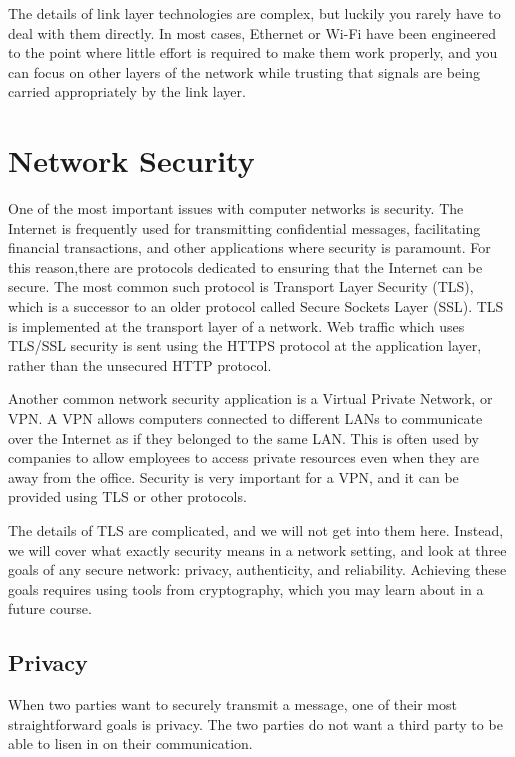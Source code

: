 The details of link layer technologies are complex, but luckily you rarely have to deal with them directly. In most cases, Ethernet or Wi-Fi have been engineered to the point where little effort is required to make them work properly, and you can focus on other layers of the network while trusting that signals are being carried appropriately by the link layer.


\section{Network Security}\label{sec:network:security}

One of the most important issues with computer networks is security. The Internet is frequently used for transmitting confidential messages, facilitating financial transactions, and other applications where security is paramount. For this reason,there are protocols dedicated to ensuring that the Internet can be secure. The most common such protocol is Transport Layer Security (TLS), which is a successor to an older protocol called Secure Sockets Layer (SSL). TLS is implemented at the transport layer of a network. Web traffic which uses TLS/SSL security is sent using the HTTPS protocol at the application layer, rather than the unsecured HTTP protocol.

Another common network security application is a Virtual Private Network, or VPN. A VPN allows computers connected to different LANs to communicate over the Internet as if they belonged to the same LAN. This is often used by companies to allow employees to access private resources even when they are away from the office. Security is very important for a VPN, and it can be provided using TLS or other protocols.

The details of TLS are complicated, and we will not get into them here. Instead, we will cover what exactly security means in a network setting, and look at three goals of any secure network: privacy, authenticity, and reliability. Achieving these goals requires using tools from cryptography, which you may learn about in a future course.

\subsection{Privacy}

When two parties want to securely transmit a message, one of their most straightforward goals is privacy. The two parties do not want a third party to be able to lisen in on their communication.

